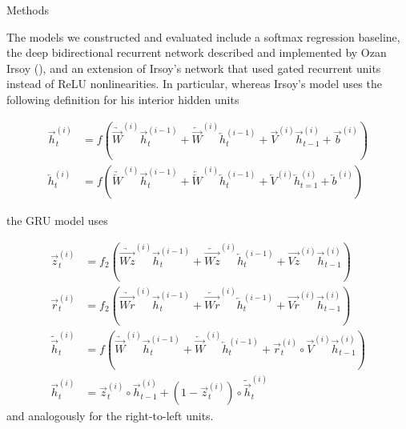 \documentclass[final]{beamer}
\newlength{\twocolwid}
\begin{document}
\begin{frame}[t]
\begin{columns}[t]
\begin{column}{\twocolwid}
\begin{column}{\twocolwid}

\begin{block}{Methods}

The models we constructed and evaluated include a softmax regression baseline, the deep bidirectional recurrent network described and implemented by Ozan Irsoy (\cite{irsoy2014opinion}), and an extension of Irsoy's network that used gated recurrent units instead of ReLU nonlinearities. In particular, whereas Irsoy's model uses the following definition for his interior hidden units

\begin{framed}
\begin{align*}
  \overrightarrow{h}_t^{(i)} &= f(\underrightarrow{\overrightarrow{W}}^{(i)} \overrightarrow{h}_t^{(i-1)} + \underleftarrow{\overrightarrow{W}}^{(i)} \overleftarrow{h}_t^{(i-1)} + \overrightarrow{V}^{(i)} \overrightarrow{h}_{t-1}^{(i)} + \overrightarrow{b}^{(i)}) \\
  \overleftarrow{h}_t^{(i)} &= f(\underrightarrow{\overleftarrow{W}}^{(i)} \overrightarrow{h}_t^{(i-1)} + \underleftarrow{\overleftarrow{W}}^{(i)} \overleftarrow{h}_t^{(i-1)} + \overleftarrow{V}^{(i)} \overleftarrow{h}_{t=1}^{(i)} + \overleftarrow{b}^{(i)})
\end{align*}
\end{framed}

the GRU model uses

\begin{framed}
\begin{align*}
  \overrightarrow{z}_t^{(i)} &= f_2(\underrightarrow{\overrightarrow{Wz}}^{(i)} \overrightarrow{h}_t^{(i-1)} + \underleftarrow{\overrightarrow{Wz}}^{(i)} \overleftarrow{h}_t^{(i-1)} + \overrightarrow{Vz}^{(i)} \overrightarrow{h}_{t-1}^{(i)}) \\
  \overrightarrow{r}_t^{(i)} &= f_2(\underrightarrow{\overrightarrow{Wr}}^{(i)} \overrightarrow{h}_t^{(i-1)} + \underleftarrow{\overrightarrow{Wr}}^{(i)} \overleftarrow{h}_t^{(i-1)} + \overrightarrow{Vr}^{(i)} \overrightarrow{h}_{t-1}^{(i)}) \\
  \widetilde{\overrightarrow{h}}_t^{(i)} &= f(\underrightarrow{\overrightarrow{W}}^{(i)} \overrightarrow{h}_t^{(i-1)} + \underleftarrow{\overrightarrow{W}}^{(i)} \overleftarrow{h}_t^{(i-1)} + \overrightarrow{r}_t^{(i)} \circ \overrightarrow{V}^{(i)} \overrightarrow{h}_{t-1}^{(i)}) \\
  \overrightarrow{h}_t^{(i)} &= \overrightarrow{z}_t^{(i)} \circ \overrightarrow{h}_{t-1}^{(i)} + (1 - \overrightarrow{z}_t^{(i)}) \circ \widetilde{\overrightarrow{h}}_t^{(i)}
\end{align*}
and analogously for the right-to-left units.
\end{framed}


\end{block}
\end{column}
\end{column}
\end{columns}
\end{frame}
\end{document}
